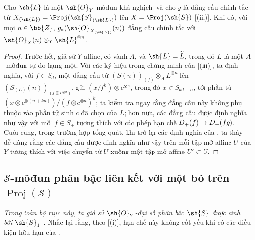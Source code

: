 \documentclass[oneside,10pt]{amsart}
\makeatletter
\newcommand{\ega@arrow}[2]{\mathchoice{#1}{#2}{#2}{#2}}
\renewcommand{\to}{\ega@arrow{\longrightarrow}{\rightarrow}}
\let\EGAOriginalLabel\label
\renewcommand{\label}[1]{\phantomsection\EGAOriginalLabel{#1}}
\makeatother
\begin{document}
\begin{proposition}[3.2.10]
\label{II.3.2.10}
Cho $\sh{L}$ là một $\sh{O}_Y$-môđun khả nghịch, và cho $g$ là đẳng cấu chính tắc từ $X_{(\sh{L})}=\Proj(\sh{S}_{(\sh{L})})$ lên $X=\Proj(\sh{S})$ [(iii)].
Khi đó, với mọi $n\in\bb{Z}$, $g_*(\sh{O}_{X_{(\sh{L})}}(n))$ đẳng cấu chính tắc với $\sh{O}_X(n)\otimes_Y\sh{L}^{\otimes n}$.
\end{proposition}

\begin{proof}
Trước hết, giả sử $Y$ affine, có vành $A$, và $\sh{L}=\widetilde{L}$, trong đó $L$ là một $A$-môđun tự do hạng một.
Với các ký hiệu trong chứng minh của [(iii)], ta định nghĩa, với $f\in S_d$, một đẳng cấu từ $(S(n))_{(f)}\otimes_A L^{\otimes n}$ lên $(S_{(L)}(n))_{(f\otimes c^{\otimes d})}$, gửi $(x/f^k)\otimes c^{\otimes n}$, trong đó $x\in S_{kd+n}$, tới phần tử $(x\otimes c^{\otimes(n+kd)})/(f\otimes c^{\otimes d})^k$;
ta kiểm tra ngay rằng đẳng cấu này không phụ thuộc vào phần tử sinh $c$ đã chọn của $L$;
hơn nữa, các đẳng cấu được định nghĩa như vậy với mỗi $f\in S_+$ tương thích với các phép hạn chế $D_+(f)\to D_+(fg)$.
Cuối cùng, trong trường hợp tổng quát, khi trở lại các định nghĩa của , ta thấy dễ dàng rằng các đẳng cấu được định nghĩa như vậy trên mỗi tập mở affine $U$ của $Y$ tương thích với việc chuyển từ $U$ xuống một tập mở affine $U'\subset U$.
\end{proof}

\subsection{$\mathcal{S}$-môđun phân bậc liên kết với một bó trên $\operatorname{Proj}(\mathcal{S})$}
\label{subsection:II.3.3}

\emph{Trong toàn bộ mục này, ta giả sử $\sh{O}_Y$-đại số phân bậc $\sh{S}$ được sinh bởi $\sh{S}_1$ .}
Nhắc lại rằng, theo [(i)], hạn chế này không cốt yếu khi có các điều kiện hữu hạn của .
\end{document}
